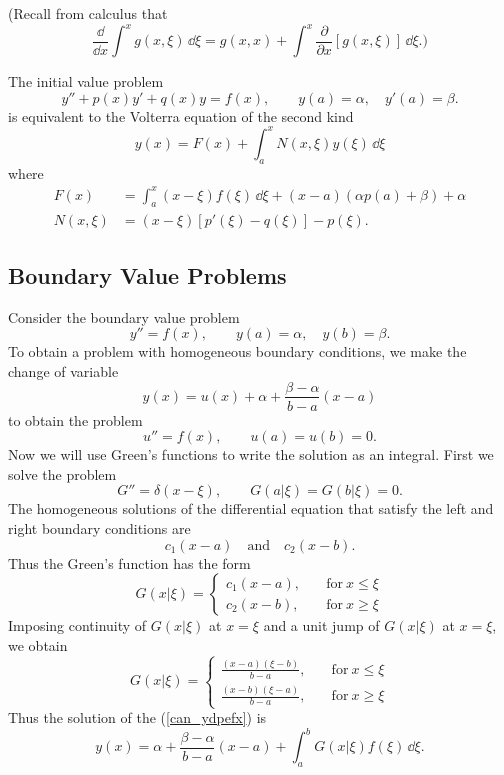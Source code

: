 (Recall from calculus that
\[
\frac{\dd}{\dd x} \int^x g(x,\xi) \,\dd \xi = g(x,x) + \int^x \frac{\partial}{\partial x} [g(x,\xi)]
\,\dd \xi.)
\]






\begin{Result}
  The initial value problem
  \[
  y'' + p(x) y' + q(x) y = f(x), \qquad y(a)=\alpha, \quad y'(a)=\beta.
  \]
  is equivalent to the Volterra equation of the second kind
  \[
  y(x) = F(x) + \int_a^x N(x,\xi) y(\xi) \,\dd \xi
  \]
  where
  \begin{align*}
    F(x) &= \int_a^x (x-\xi) f(\xi) \,\dd \xi + (x-a) (\alpha p(a) +\beta) +\alpha \\
    N(x,\xi) &= (x-\xi) [p'(\xi)-q(\xi)]-p(\xi).
  \end{align*}
\end{Result}




















\subsection{Boundary Value Problems}


Consider the boundary value problem
\begin{equation}
  \label{can_ydpefx}
  y'' = f(x), \qquad y(a) = \alpha, \quad y(b) = \beta.
\end{equation}
To obtain a problem with homogeneous boundary conditions, we make the 
change of variable
\[
y(x) = u(x) + \alpha + \frac{\beta-\alpha}{b-a} (x-a)
\]
to obtain the problem
\[
u'' = f(x), \qquad u(a) = u(b) = 0.
\]
Now we will use Green's functions to write the solution as an integral.  
First we solve the problem
\[
G'' = \delta(x-\xi), \qquad G(a|\xi) = G(b|\xi) = 0.
\]
The homogeneous solutions of the differential equation that satisfy the 
left and right boundary conditions are
\[
c_1 (x-a) \quad \mathrm{and} \quad c_2 (x-b).
\]
Thus the Green's function has the form
\[
G(x|\xi) = 
\begin{cases}
  c_1 (x-a), \quad &\mathrm{for}\ x \leq \xi \\
  c_2 (x-b), \quad &\mathrm{for}\ x \geq \xi
\end{cases}
\]
Imposing continuity of $G(x|\xi)$ at $x=\xi$ and a unit jump of $G(x|\xi)$ 
at $x=\xi$, we obtain
\[
G(x|\xi) = 
\begin{cases}
  \frac{(x-a)(\xi-b)}{b-a}, \quad &\mathrm{for}\ x \leq \xi \\
  \frac{(x-b)(\xi-a)}{b-a}, \quad &\mathrm{for}\ x \geq \xi
\end{cases}
\]
Thus the solution of the (\ref{can_ydpefx}) is
\[
y(x) = \alpha + \frac{\beta-\alpha}{b-a} (x-a)
+ \int_a^b G(x|\xi) f(\xi) \,\dd \xi.
\]




